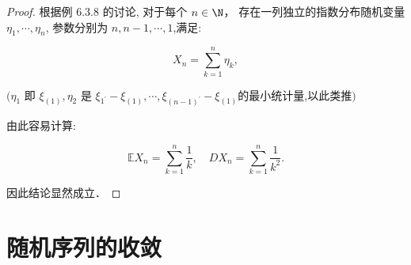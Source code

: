 \begin{itemize}
\begin{proof}
    根据例 6.3.8 的讨论,
    对于每个 $n\in \N$，
    存在一列独立的指数分布随机变量  $\eta_{1}, \cdots, \eta_{n}$,
    参数分别为  $n, n-1, \cdots, 1  $,满足:

$$X_{n}=\sum_{k=1}^{n} \eta_{k},$$

 $(\eta_{1}$ 
 即  $\xi_{(1)}, \eta_{2}$
 是  $\xi_{1^{\prime}}-\xi_{(1)}, \cdots, \xi_{(n-1)^{\prime}}-\xi_{(1)}  $的最小统计量,以此类推$)$
 
 由此容易计算:

$$\mathbb{E} X_{n}=\sum_{k=1}^{n} \frac{1}{k}, \quad D X_{n}=\sum_{k=1}^{n} \frac{1}{k^{2}}.$$

因此结论显然成立．
\end{proof}

\end{itemize}

\section{随机序列的收敛}

